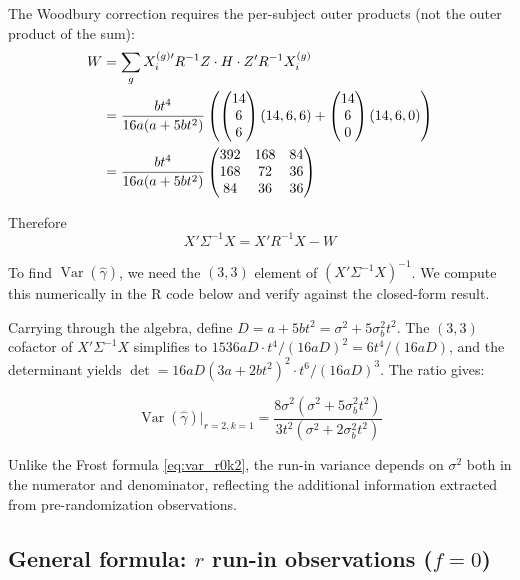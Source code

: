 \documentclass[
]{article}
\begin{document}
The Woodbury correction requires the per-subject outer products (not the
outer product of the sum): \begin{align}
  W &= \sum_{g} X_i^{(g)\prime} R^{-1} Z
    \cdot H \cdot
    Z' R^{-1} X_i^{(g)} \notag \\
  &= \frac{bt^4}{16a(a+5bt^2)}
    \left(
      \begin{pmatrix}14\\6\\6\end{pmatrix}
      (14,6,6)
      + \begin{pmatrix}14\\6\\0\end{pmatrix}
      (14,6,0)
    \right) \notag \\
  &= \frac{bt^4}{16a(a+5bt^2)}
    \begin{pmatrix}
      392 & 168 & 84 \\
      168 & 72 & 36 \\
      84 & 36 & 36
    \end{pmatrix}
\end{align}

Therefore \begin{equation}
  X'\Sigma^{-1}X = X'R^{-1}X - W
\end{equation}

To find \(\mathop{\mathrm{Var}}(\hat{\gamma})\), we need the \((3,3)\)
element of \((X'\Sigma^{-1}X)^{-1}\). We compute this numerically in the
R code below and verify against the closed-form result.

Carrying through the algebra, define \(D = a + 5bt^2 =
\sigma^2 + 5\sigma_b^2 t^2\). The \((3,3)\) cofactor of
\(X'\Sigma^{-1}X\) simplifies to \(1536aD \cdot
t^4/(16aD)^2 = 6t^4/(16aD)\), and the determinant yields
\(\det = 16aD(3a+2bt^2)^2 \cdot t^6/(16aD)^3\). The ratio gives:

\begin{equation}
  \boxed{
    \mathop{\mathrm{Var}}(\hat{\gamma})\big|_{r=2,k=1}
    = \frac{8\sigma^2(\sigma^2 + 5\sigma_b^2 t^2)}
           {3t^2(\sigma^2 + 2\sigma_b^2 t^2)}
  }
  \label{eq:var_r2k1}
\end{equation}

Unlike the Frost formula \eqref{eq:var_r0k2}, the run-in variance
depends on \(\sigma^2\) both in the numerator and denominator,
reflecting the additional information extracted from pre-randomization
observations.

\subsection{\texorpdfstring{General formula: \(r\) run-in observations
(\(f=0\))}{General formula: r run-in observations (f=0)}}\label{general-formula-r-run-in-observations-f0}
\end{document}
